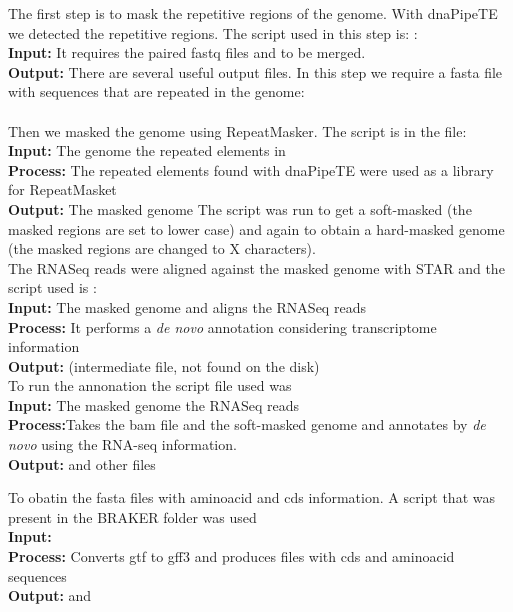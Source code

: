 \documentclass[a4paper,12pt]{article}
\begin{document}
The first step is to mask the repetitive regions of the genome. With dnaPipeTE we detected the repetitive regions. The script used in this step is: :\\
\textbf{Input:} It requires the paired fastq files  and  to be merged.\\
\textbf{Output:} There are several useful output files. In this step we require a fasta file with sequences that are repeated in the genome:\\
\\

Then we masked the genome using RepeatMasker. The script is in the file: 
\textbf{Input:} The genome  the repeated elements in  \\
\textbf{Process:} The repeated elements found with dnaPipeTE were used as a library for RepeatMasket\\
\textbf{Output:} The masked genome 
The script was run to get a soft-masked (the masked regions are set to lower case) and again to obtain a hard-masked genome  (the masked regions are changed to X characters).\\

The RNASeq reads were aligned against the masked genome with STAR and the script used is :\\
\textbf{Input:} The masked genome  and aligns the RNASeq reads\\
\textbf{Process:} It performs a \textit{de novo} annotation considering transcriptome information\\
\textbf{Output:}  (intermediate file, not found on the disk)\\



To run the annonation the script file used was \\
\textbf{Input:} The masked genome the RNASeq reads\\
\textbf{Process:}Takes the bam file and the soft-masked genome and annotates by \textit{de novo} using the RNA-seq information.\\
\textbf{Output:}  and other files

To obatin the fasta files with aminoacid and cds information. A script that was present in the BRAKER folder was used \\
\textbf{Input:} \\
\textbf{Process:} Converts gtf to gff3 and produces files with cds and aminoacid sequences\\
\textbf{Output:}  and 
\end{document}
